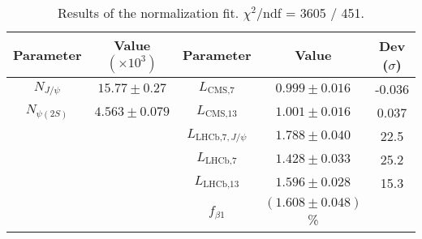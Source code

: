 \begin{table}[h!]
\centering
\begin{tabular}{c | c || c | c | c}
Parameter & Value $(\times10^3)$ & Parameter & Value & Dev ($\sigma$) \\
\hline
$N_{J/\psi}$ & $15.77\pm0.27$ & $L_{\text{CMS,7}}$ & $0.999\pm0.016$ & -0.036 \\
$N_{\psi(2S)}$ & $4.563\pm0.079$ & $L_{\text{CMS,13}}$ & $1.001\pm0.016$ & 0.037 \\
\hline 
 &  & $L_{\text{LHCb,7},J/\psi}$ & $1.788\pm0.040$ & 22.5 \\
 &  & $L_{\text{LHCb,7}}$ & $1.428\pm0.033$ & 25.2 \\
 &  & $L_{\text{LHCb,13}}$ & $1.596\pm0.028$ & 15.3 \\
\hline
& & $f_{\beta1}$ & $(1.608\pm0.048)$\% & 
\end{tabular}
\caption{Results of the normalization fit. $\chi^2/$ndf = 3605 / 451.}
\label{t:fit}
\end{table}
